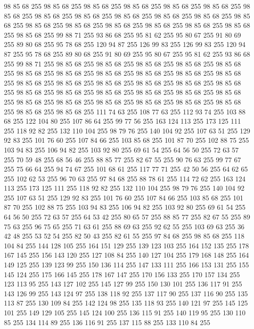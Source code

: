 98 85 68 255 98 85 68 255 98 85 68 255 98 85 68 255 98 85 68 255 98 85 68 255 98 85 68 255 98 85 68 255 98 85 68 255 98 85 68 255 98 85 68 255 98 85 68 255 98 85 68 255 98 85 68 255 98 85 68 255 98 85 68 255 98 85 68 255 98 85 68 255 98 85 68 255 98 85 68 255 99 88 71 255 93 86 68 255 95 81 62 255 95 80 67 255 91 80 69 255 89 80 68 255 95 78 68 255 120 94 87 255 126 99 83 255 126 99 83 255 120 94 87 255 95 78 68 255 89 80 68 255 91 80 69 255 95 80 67 255 95 81 62 255 93 86 68 255 99 88 71 255 98 85 68 255 98 85 68 255 98 85 68 255 98 85 68 255 98 85 68 255 98 85 68 255 98 85 68 255 98 85 68 255 98 85 68 255 98 85 68 255 98 85 68 255 98 85 68 255 98 85 68 255 98 85 68 255 98 85 68 255 98 85 68 255 98 85 68 255 98 85 68 255 98 85 68 255 98 85 68 255 98 85 68 255 98 85 68 255 98 85 68 255 98 85 68 255 98 85 68 255 98 85 68 255
98 85 68 255 98 85 68 255 98 85 68 255 98 85 68 255 98 85 68 255 111 74 63 255 108 77 63 255 112 93 74 255 103 88 68 255 122 104 80 255 107 86 64 255 99 77 56 255 163 124 113 255 173 125 111 255 118 92 82 255 132 110 104 255 98 79 76 255 140 104 92 255 107 63 51 255 129 92 83 255 101 76 60 255 107 84 66 255 103 85 68 255 101 87 70 255 102 88 75 255 103 94 83 255 106 94 82 255 103 92 80 255 69 61 54 255 64 56 50 255 72 63 57 255 70 59 48 255 68 56 46 255 88 85 77 255 82 67 55 255 90 76 63 255 99 77 67 255 75 66 64 255 94 74 67 255 101 68 61 255 117 77 71 255 42 50 56 255 64 62 65 255 102 62 53 255 96 70 63 255 97 84 68 255 88 78 61 255 114 72 62 255 163 124 113 255 173 125 111 255 118 92 82 255 132 110 104 255 98 79 76 255 140 104 92 255 107 63 51 255 129 92 83 255 101 76 60 255 107 84 66 255 103 85 68 255 101 87 70 255 102 88 75 255 103 94 83 255 106 94 82 255 103 92 80 255
69 61 54 255 64 56 50 255 72 63 57 255 64 53 42 255 80 65 57 255 88 85 77 255 82 67 55 255 89 75 63 255 96 75 65 255 71 63 61 255 88 69 63 255 92 62 55 255 103 69 63 255 36 42 48 255 53 52 54 255 82 50 43 255 82 61 55 255 97 84 68 255 98 85 68 255 118 104 84 255 144 128 105 255 164 151 129 255 139 123 103 255 164 152 135 255 178 167 145 255 156 143 120 255 127 108 84 255 140 127 104 255 179 168 148 255 164 149 125 255 139 123 99 255 150 136 114 255 147 133 111 255 166 153 131 255 155 145 124 255 175 166 145 255 178 167 147 255 170 156 133 255 170 157 134 255 123 113 95 255 143 127 102 255 145 127 99 255 150 130 101 255 136 117 91 255 143 126 99 255 143 124 97 255 138 118 92 255 137 117 90 255 137 116 90 255 135 113 87 255 130 109 84 255 142 124 98 255 135 118 93 255 140 121 97 255 145 125 101 255 149 129 105 255 145 124 100 255 136 115 91 255 140 119 95 255 130 110 85 255 134 114 89 255 136 116 91 255 137 115 88 255 133 110 84 255
